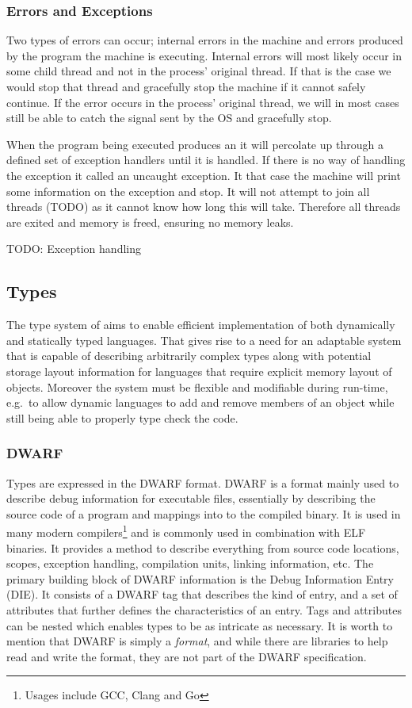 \subsubsection{Errors and Exceptions}
Two types of errors can occur; internal errors in the machine and errors
produced by the program the machine is executing. Internal errors will most
likely occur in some child thread and not in the process' original thread. If
that is the case we would stop that thread and gracefully stop the machine if it
cannot safely continue. If the error occurs in the process' original thread, we
will in most cases still be able to catch the signal sent by the OS and
gracefully stop.

When the program being executed produces an  it will percolate
up through a defined set of exception handlers until it is handled. If there is
no way of handling the exception it called an uncaught exception. It that case
the machine will print some information on the exception and stop. It will not
attempt to join all threads (TODO) as it cannot know how long this will
take. Therefore all threads are exited and memory is freed, ensuring no memory
leaks.

TODO: Exception handling


\subsection{Types}

The type system of \thename{} aims to enable efficient implementation of both
dynamically and statically typed languages. That gives rise to a need for an
adaptable system that is capable of describing arbitrarily complex types along
with potential storage layout information for languages that require explicit
memory layout of objects. Moreover the system must be flexible and modifiable
during run-time, e.g.~to allow dynamic languages to add and remove members of an
object while still being able to properly type check the code.

\subsubsection{DWARF}

Types are expressed in the DWARF format\cite{dwarf}. DWARF is a format mainly
used to describe debug information for executable files, essentially by
describing the source code of a program and mappings into to the compiled
binary. It is used in many modern compilers\footnote{Usages include GCC, Clang
  and Go} and is commonly used in combination with ELF binaries. It provides a
method to describe everything from source code locations, scopes, exception
handling, compilation units, linking information, etc. The primary building
block of DWARF information is the Debug Information Entry (DIE). It consists of
a DWARF tag that describes the kind of entry, and a set of attributes that
further defines the characteristics of an entry. Tags and attributes can be
nested which enables types to be as intricate as necessary. It is worth to
mention that DWARF is simply a \emph{format}, and while there are libraries to
help read and write the format, they are not part of the DWARF specification.

